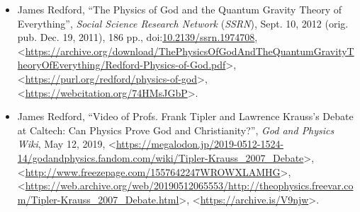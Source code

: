 \documentclass[letterpaper,12pt]{article}
\newcommand{\dsc}{\discretionary{}{}{}}
\begin{document}
\begin{itemize}
\small
\item James Redford, ``The Physics of God and the Quantum Gravity Theory of Everything'', \emph{Social Science Research Network} (\emph{SSRN}), Sept. 10, 2012 (orig. pub. Dec. 19, 2011), 186 pp., doi:\discretionary{}{}{}\href{https://dx.doi.org/10.2139/ssrn.1974708}{10\dsc .2139/\dsc ssrn\dsc .1974708}, \textless\href{https://archive.org/download/ThePhysicsOfGodAndTheQuantumGravityTheoryOfEverything/Redford-Physics-of-God.pdf}{\textsf{https\dsc :\dsc //\dsc archive\dsc .org/\dsc download/\dsc The\dsc Physics\dsc Of\dsc God\dsc And\dsc The\dsc Quantum\dsc Gravity\dsc Theory\dsc Of\dsc Everything/\dsc Redford\dsc -Physics\dsc -of\dsc -God\dsc .pdf}}\textgreater , \textless\href{https://purl.org/redford/physics-of-god}{\textsf{https\dsc :\dsc //\dsc purl\dsc .org/\dsc redford/\dsc physics\dsc -of\dsc -god}}\textgreater , \textless\href{https://webcitation.org/74HMsJGbP}{\textsf{https\dsc :\dsc //\dsc webcitation\dsc .org/\dsc 74HMsJGbP}}\textgreater .

\item James Redford, ``Video of Profs. Frank Tipler and Lawrence Krauss's Debate at Caltech: Can Physics Prove God and Christianity?'', \emph{God and Physics Wiki}, May 12, 2019, \textless\href{https://megalodon.jp/2019-0512-1524-14/godandphysics.fandom.com/wiki/Tipler-Krauss_2007_Debate}{\textsf{https\dsc :\dsc //\dsc mega\dsc lodon\dsc .jp/\dsc 2019\dsc -0512\dsc -1524\dsc -14/\dsc god\dsc and\dsc physics\dsc .fandom\dsc .com/\dsc wiki/\dsc Tipler\dsc -Krauss\dsc \_2007\dsc \_Debate}}\textgreater , \textless\href{http://www.freezepage.com/1557642247WROWXLAMHG}{\textsf{http\dsc :\dsc //\dsc www\dsc .freeze\dsc page\dsc .com/\dsc 1557642247\dsc WROWXLAMHG}}\textgreater , \textless\href{https://web.archive.org/web/20190512065553/http://theophysics.freevar.com/Tipler-Krauss_2007_Debate.html}{\textsf{https\dsc :\dsc //\dsc web\dsc .archive\dsc .org/\dsc web/\dsc 20190512\dsc 065553/\dsc http\dsc :\dsc //\dsc theo\dsc physics\dsc .freevar\dsc .com/\dsc Tipler\dsc -Krauss\dsc \_2007\dsc \_Debate\dsc .html}}\textgreater , \textless\href{https://archive.is/V9njw}{\textsf{https\dsc :\dsc //\dsc archive\dsc .is/\dsc V9njw}}\textgreater .


\end{itemize}
\end{document}
